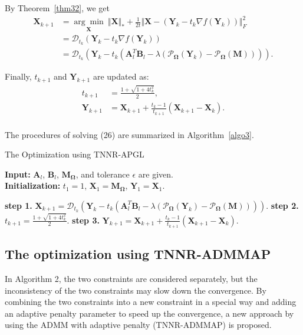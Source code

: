 \documentclass[fontset=windows]{article}
\begin{document}
{By Theorem~\ref{thm32}, we get
\begin{equation}
    \begin{aligned}
        \mathbf X_{k+1} & = \underset{\mathbf X}{\arg\min}\  \Vert\mathbf X \Vert_* + \frac{1}{2t}\Vert\mathbf X- (\mathbf Y_k -t_k \nabla f(\mathbf Y_k))\Vert_F^2 \\
        & = \mathcal{D}_{t_k}(\mathbf Y_k - t_k\nabla f(\mathbf Y_k)) \\
        & = \mathcal{D}_{t_k}(\mathbf Y_k - t_k(\mathbf A_l^T\mathbf B_l - \lambda(\mathcal{P}_{\mathbf\Omega}(\mathbf Y_k)- \mathcal{P}_{\mathbf\Omega}(\mathbf M)))).
    \end{aligned}
\end{equation}

Finally, $t_{k+1}$ and $\mathbf Y_{k+1}$ are updated as:
\begin{equation}
    \begin{aligned}
        t_{k+1} & = \frac{1+\sqrt{1+4t^2_k}}{2}, \\
        \mathbf Y_{k+1}& = \mathbf X_{k+1} +\frac{t_{k}-1}{t_{k+1}}(\mathbf X_{k+1}-\mathbf X_{k}). \\
    \end{aligned}
\end{equation}

The procedures of solving (26) are summarized in Algorithm~\ref{algo3}.

\begin{algorithm}[t]
    \caption{The Optimization using TNNR-APGL}
    \label{algo3}
    \textbf{Input:} $\mathbf A_l$, $\mathbf B_l$, $\mathbf M_{\mathbf\Omega}$, and tolerance $\epsilon$ are given.\\
    \textbf{Initialization:} $t_1 = 1$, $\mathbf X_1 = \mathbf M_{\mathbf\Omega}$, $\mathbf Y_1=\mathbf X_1$.
    \begin{algorithmic}
        \Repeat 
        \State \textbf{step 1.} $\mathbf X_{k+1} = \mathcal{D}_{t_k}(\mathbf Y_k - t_k(\mathbf A_l^T\mathbf B_l - \lambda(\mathcal{P}_{\mathbf\Omega}(\mathbf Y_k)- \mathcal{P}_{\mathbf\Omega}(\mathbf M))))$.
        \State \textbf{step 2.} $t_{k+1} = \frac{1+\sqrt{1+4t^2_k}}{2}$.
        \State \textbf{step 3.} $\mathbf Y_{k+1} = \mathbf X_{k+1} +\frac{t_{k}-1}{t_{k+1}}(\mathbf X_{k+1}-\mathbf X_{k})$.
    \end{algorithmic}
\end{algorithm}


\subsection{The optimization using TNNR-ADMMAP}
In Algorithm 2, the two constraints are considered separately, but the inconsistency of the two constraints may slow down the convergence.
By combining the two constraints into a new constraint in a special way\cite{he2012alternating} and adding an adaptive penalty parameter\cite{lin2011linearized} to speed up the convergence,  a new approach by using the ADMM with adaptive penalty (TNNR-ADMMAP) is proposed.
}
\end{document}
